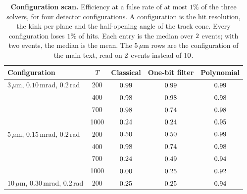 \documentclass[11pt,a4paper]{article}
\newcommand{\gss}[1]{{\color{teal} #1}}
\begin{document}
\begin{table}[H]
\centering\footnotesize
\caption{\gss{\textbf{Post-selection probability against track multiplicity.} $P$ is the median over the $\NEvents$ events; rounds are the amplification rounds $\pi/(4\sqrt P)$. The values at 400 and 1000 tracks are those of table~\ref{tab:cost}.}}
\label{tab:P}

\end{table}

\begin{table}[H]
\centering\footnotesize
\caption{\gss{\textbf{Configuration scan.} Efficiency at a false rate of at most $1\%$ of the three solvers, for four detector configurations. A configuration is the hit resolution, the kink per plane and the half-opening angle of the track cone. Every configuration loses $1\%$ of hits. Each entry is the median over $2$ events; with two events, the median is the mean. The $5\,\mu$m rows are the configuration of the main text, read on $2$ events instead of $\NEvents$.}}
\label{tab:scan}
\begin{tabular}{lcccc}\toprule
Configuration & $T$ & Classical & One-bit filter & Polynomial\\\midrule
$3\,\mu$m, $0.10$\,mrad, $0.2$\,rad & 200 & $0.99$ & $0.99$ & $0.99$\\
 & 400 & $0.98$ & $0.98$ & $0.98$\\
 & 700 & $0.98$ & $0.74$ & $0.98$\\
 & 1000 & $0.24$ & $0.24$ & $0.95$\\
\addlinespace
$5\,\mu$m, $0.15$\,mrad, $0.2$\,rad & 200 & $0.50$ & $0.50$ & $0.99$\\
 & 400 & $0.98$ & $0.74$ & $0.98$\\
 & 700 & $0.24$ & $0.49$ & $0.94$\\
 & 1000 & $0.00$ & $0.25$ & $0.92$\\
\addlinespace
$10\,\mu$m, $0.30$\,mrad, $0.2$\,rad & 200 & $0.25$ & $0.25$ & $0.94$\\

\end{tabular}
\end{table}
\end{document}
